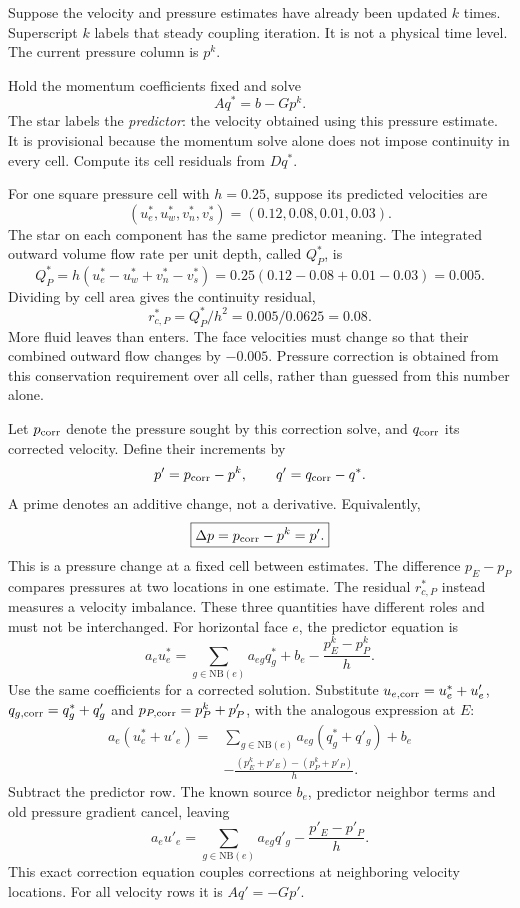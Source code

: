 Suppose the velocity and pressure estimates have already been updated $k$
times. Superscript $k$ labels that steady coupling iteration. It is not a
physical time level. The current pressure column is $p^k$.

Hold the momentum coefficients fixed and solve
\[
Aq^*=b-Gp^k.
\]
The star labels the \emph{predictor}: the velocity obtained using this pressure
estimate. It is provisional because the momentum solve alone does not impose
continuity in every cell. Compute its cell residuals from $Dq^*$.

For one square pressure cell with $h=0.25$, suppose its predicted velocities are
\[
(u_e^*,u_w^*,v_n^*,v_s^*)=(0.12,0.08,0.01,0.03).
\]
The star on each component has the same predictor meaning. The integrated
outward volume flow rate per unit depth, called $Q_P^*$, is
\[
Q_P^*=h(u_e^*-u_w^*+v_n^*-v_s^*)
=0.25(0.12-0.08+0.01-0.03)=0.005.
\]
Dividing by cell area gives the continuity residual,
\[
r_{c,P}^*=Q_P^*/h^2=0.005/0.0625=0.08.
\]
More fluid leaves than enters. The face velocities must change so that their
combined outward flow changes by $-0.005$. Pressure correction is obtained
from this conservation requirement over all cells, rather than guessed from
this number alone.

Let $p_{\rm corr}$ denote the pressure sought by this correction solve, and
$q_{\rm corr}$ its corrected velocity. Define their increments by
\[
p'=p_{\rm corr}-p^k,\qquad q'=q_{\rm corr}-q^*.
\]
A prime denotes an additive change, not a derivative. Equivalently,
\[
\boxed{\Delta p=p_{\rm corr}-p^k=p'.}
\]
This is a pressure change at a fixed cell between estimates.
The difference $p_E-p_P$ compares pressures at two locations in one estimate.
The residual $r_{c,P}^*$ instead measures a velocity imbalance. These three
quantities have different roles and must not be interchanged.
\newpage
{}
For horizontal face $e$, the predictor equation is
\[
a_eu_e^*=\sum_{g\in\mathrm{NB}(e)}a_{eg}q_g^*
          +b_e-\frac{p_E^k-p_P^k}{h}.
\]
Use the same coefficients for a corrected solution. Substitute
$u_{e,\rm corr}=u_e^*+u'_e$, $q_{g,\rm corr}=q_g^*+q'_g$ and
$p_{P,\rm corr}=p_P^k+p'_P$, with the analogous expression at $E$:
\begin{align*}
a_e(u_e^*+u'_e)={}&\sum_{g\in\mathrm{NB}(e)}a_{eg}(q_g^*+q'_g)+b_e\\
 &-\frac{(p_E^k+p'_E)-(p_P^k+p'_P)}{h}.
\end{align*}
Subtract the predictor row. The known source $b_e$, predictor neighbor terms
and old pressure gradient cancel, leaving
\[
a_eu'_e=\sum_{g\in\mathrm{NB}(e)}a_{eg}q'_g-\frac{p'_E-p'_P}{h}.
\]
This exact correction equation couples corrections at neighboring velocity
locations. For all velocity rows it is $Aq'=-Gp'$.

